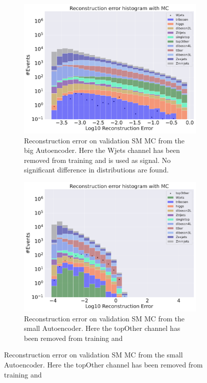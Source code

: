\begin{figure}[H]
\begin{subfigure}{.45\textwidth}
        \includegraphics[width=\textwidth]{Figures/AE_testing/big/b_data_recon_big_rm3_feats_sig_Wjets.pdf}
        \caption{Reconstruction error on validation SM MC from the big Autoencoder. Here the Wjets channel has been removed from training and 
        is used as signal. No significant difference in distributions are found. }
        \label{fig:ae_big_Wjets}
    \end{subfigure}
    \hfill 
    \begin{subfigure}{.45\textwidth}
        \includegraphics[width=\textwidth]{Figures/AE_testing/small/b_data_recon_big_rm3_feats_sig_topOther.pdf}
        \caption{Reconstruction error on validation SM MC from the small Autoencoder. Here the topOther channel has been removed from training and 
}
\end{subfigure}
\end{figure}
